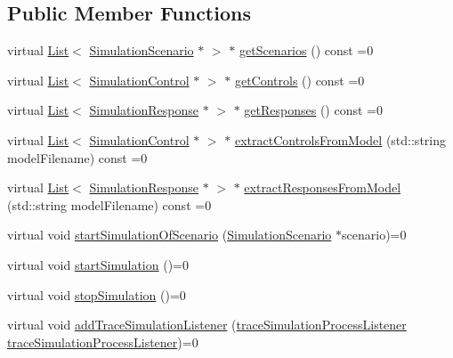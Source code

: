 \subsection*{Public Member Functions}
\begin{DoxyCompactItemize}
\item 
virtual \hyperlink{class_list}{List}$<$ \hyperlink{class_simulation_scenario}{Simulation\+Scenario} $\ast$ $>$ $\ast$ \hyperlink{class_process_analyser__if_a4cec163a7fc994f7d2cc5d642d3f9b84}{get\+Scenarios} () const =0
\item 
virtual \hyperlink{class_list}{List}$<$ \hyperlink{class_simulation_control}{Simulation\+Control} $\ast$ $>$ $\ast$ \hyperlink{class_process_analyser__if_a639a16af5f2ad52e63fce4dc751c9fd4}{get\+Controls} () const =0
\item 
virtual \hyperlink{class_list}{List}$<$ \hyperlink{class_simulation_response}{Simulation\+Response} $\ast$ $>$ $\ast$ \hyperlink{class_process_analyser__if_ab434ec8f01acb7730557f3ff9a460798}{get\+Responses} () const =0
\item 
virtual \hyperlink{class_list}{List}$<$ \hyperlink{class_simulation_control}{Simulation\+Control} $\ast$ $>$ $\ast$ \hyperlink{class_process_analyser__if_a27b1e534ff72b8faecc28ae7419dd588}{extract\+Controls\+From\+Model} (std\+::string model\+Filename) const =0
\item 
virtual \hyperlink{class_list}{List}$<$ \hyperlink{class_simulation_response}{Simulation\+Response} $\ast$ $>$ $\ast$ \hyperlink{class_process_analyser__if_a0a13770b90d56f44fe89e4a2e940800e}{extract\+Responses\+From\+Model} (std\+::string model\+Filename) const =0
\item 
virtual void \hyperlink{class_process_analyser__if_a55396a5eb2eebc928eb7681d1f8f87ea}{start\+Simulation\+Of\+Scenario} (\hyperlink{class_simulation_scenario}{Simulation\+Scenario} $\ast$scenario)=0
\item 
virtual void \hyperlink{class_process_analyser__if_ad0949759ce49af24bba3e8875b164675}{start\+Simulation} ()=0
\item 
virtual void \hyperlink{class_process_analyser__if_aeb292cf1587fda460b9d551bfc65c6e4}{stop\+Simulation} ()=0
\item 
virtual void \hyperlink{class_process_analyser__if_abdbb0685841e8366507f77a6884451c3}{add\+Trace\+Simulation\+Listener} (\hyperlink{_trace_manager_8h_a7ff1963642ecda8c9a76991b351f0385}{trace\+Simulation\+Process\+Listener} \hyperlink{_trace_manager_8h_a7ff1963642ecda8c9a76991b351f0385}{trace\+Simulation\+Process\+Listener})=0
\end{DoxyCompactItemize}


